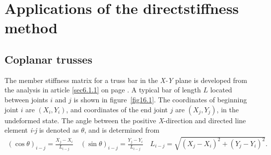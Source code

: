\documentclass{AeroStructure-ERJohnson}
\begin{document}
\mainmatter
\setcounter{chapter}{15}
\setcounter{page}{399}

\chapter{Applications of the direct\break stiffness method} \label{ch16}

\section{Coplanar trusses}

The member stiffness matrix for a truss bar in the \textit{X-Y} plane is developed from the analysis in article \ref{sec6.1.1} on page \pageref{sec6.1.1}. A typical bar of length $L$ located between joints $i$ and $j$ is shown in figure~\ref{fig16.1}. The coordinates of beginning joint $i$ are $\left(X_{i}, Y_{i}\right)$, and coordinates of the end joint $j$ are $\left(X_{j}, Y_{j}\right)$, in the undeformed state. The angle between the positive \textit{X}-direction and directed line element \textit{i-j} is denoted as $\theta$, and is determined from
\begin{align}\label{eq16.1}
(\cos \theta)_{i-j}=\frac{X_{j}-X_{i}}{L_{i-j}} \quad(\sin \theta)_{i-j}=\frac{Y_{j}-Y_{i}}{L_{i-j}} \quad L_{i-j}=\sqrt{\left(X_{j}-X_{i}\right)^{2}+\left(Y_{j}-Y_{i}\right)^{2}}.
\end{align}


\vspace*{-1pc}
\end{document}
